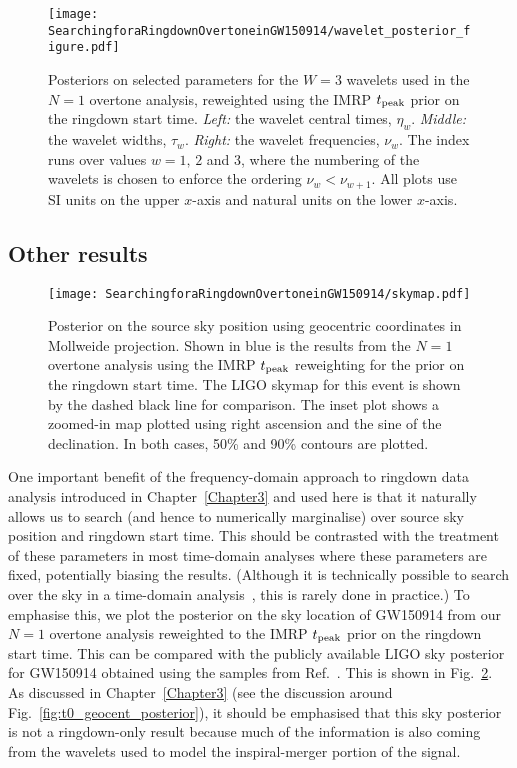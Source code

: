 \begin{figure}[t]
    \centering
    \texttt{[image: SearchingforaRingdownOvertoneinGW150914/wavelet\_posterior\_figure.pdf]}
    \caption[Posteriors on selected wavelet parameters]{ 
    Posteriors on selected parameters for the $W=3$ wavelets used in the $N=1$ overtone analysis, reweighted using the IMRP $t_{\rm peak}$ prior on the ringdown start time.
    \emph{Left:} the wavelet central times, $\eta_w$.
    \emph{Middle:} the wavelet widths, $\tau_w$.
    \emph{Right:} the wavelet frequencies, $\nu_w$. 
    The index runs over values $w=1,\,2$ and $3$, where the numbering of the wavelets is chosen to enforce the ordering $\nu_{w}<\nu_{w+1}$.
    All plots use SI units on the upper $x$-axis and natural units on the lower $x$-axis. 
    }
    \label{fig:wavelet}
\end{figure}



\subsection{Other results}\label{subsec:other_results}

\begin{figure}[b!]
    \centering
    \texttt{[image: SearchingforaRingdownOvertoneinGW150914/skymap.pdf]}
    \caption[Posterior on the GW150914 sky location]{ 
    Posterior on the source sky position using geocentric coordinates in Mollweide projection.
    Shown in blue is the results from the $N=1$ overtone analysis using the IMRP $t_{\rm peak}$ reweighting for the prior on the ringdown start time.
    The LIGO skymap for this event is shown by the dashed black line for comparison.
    The inset plot shows a zoomed-in map plotted using right ascension and the sine of the declination.
    In both cases, 50\% and 90\% contours are plotted.
    }
    \label{fig:skymap}
\end{figure}

One important benefit of the frequency-domain approach to ringdown data analysis introduced in Chapter~\ref{Chapter3} and used here is that it naturally allows us to search (and hence to numerically marginalise) over source sky position and ringdown start time. 
This should be contrasted with the treatment of these parameters in most time-domain analyses where these parameters are fixed, potentially biasing the results. (Although it is technically possible to search over the sky in a time-domain analysis~\cite{Carullo:2019flw, Isi:2021iql}, this is rarely done in practice.)
To emphasise this, we plot the posterior on the sky location of GW150914 from our $N=1$ overtone analysis reweighted to the IMRP $t_{\rm peak}$ prior on the ringdown start time.
This can be compared with the publicly available LIGO sky posterior for GW150914 obtained using the samples from Ref.~\cite{skysamples}.
This is shown in Fig.~\ref{fig:skymap}.
As discussed in Chapter~\ref{Chapter3} (see the discussion around Fig.~\ref{fig:t0_geocent_posterior}), it should be emphasised that this sky posterior is not a ringdown-only result because much of the information is also coming from the wavelets used to model the inspiral-merger portion of the signal.

